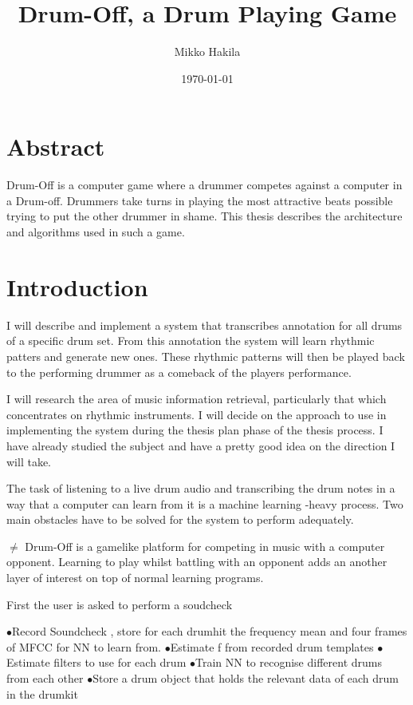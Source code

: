 \documentclass[10pt]{article}
\title{Drum-Off, a Drum Playing Game}
\author{Mikko Hakila}
\date{\today}
\begin{document}
\maketitle
\newpage 

\tableofcontents

\newpage 
\section*{Abstract}
Drum-Off is a computer game where a drummer competes against a computer in a Drum-off. Drummers take turns in playing the most attractive beats possible trying to put the other drummer in shame. This thesis describes the architecture and algorithms used in such a game.

\section{Introduction}
I will describe and implement a system that transcribes annotation for all drums of a specific drum set. From this annotation the system will learn rhythmic patters and generate new ones. These rhythmic patterns will then be played back to the performing drummer as a comeback of the players performance.

I will research the area of music information retrieval, particularly that which concentrates on rhythmic instruments. I will decide on the approach to use in implementing the system during the thesis plan phase of the thesis process. I have already studied the subject and have a pretty good idea on the direction I will take.

 The task of listening to a live drum audio and transcribing the drum notes in a way that a computer can learn from it is a machine learning -heavy process. Two main obstacles have to be solved for the system to perform adequately. 
 
$\neq$ Drum-Off is a gamelike platform for competing in music with a computer opponent. Learning to play whilst battling with an opponent adds an another layer of interest on top of normal learning programs. 

First the user is asked to perform a soudcheck

$ \bullet $Record Soundcheck , store for each drumhit the frequency mean and four frames of MFCC for NN to learn from.
$ \bullet $Estimate f from recorded drum templates 
$ \bullet $Estimate filters to use for each drum
$ \bullet $Train NN to recognise different drums from each other
$ \bullet $Store a drum object that holds the relevant data of each drum in the drumkit
\\
\end{document}
